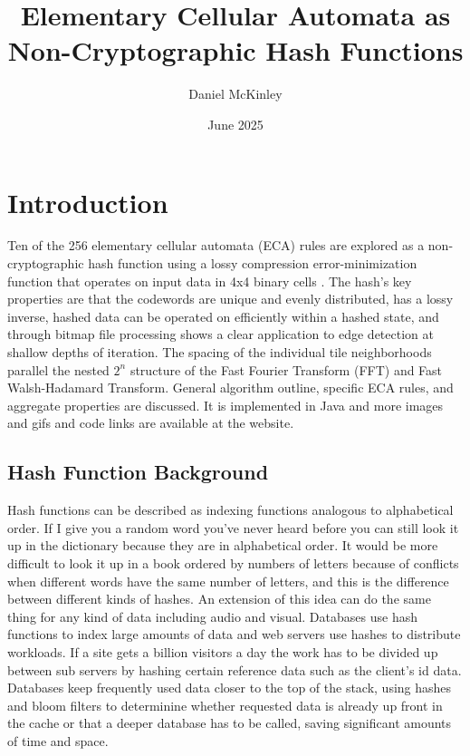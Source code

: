 \documentclass[11pt]{article}
\title{Elementary Cellular Automata as Non-Cryptographic Hash Functions}
\date{June 2025}
\author{Daniel McKinley}
\begin{document}
\maketitle

\section{Introduction}

Ten of the 256 elementary cellular automata (ECA) rules are explored as a non-cryptographic hash function using a lossy compression error-minimization function that operates on input data in 4x4 binary cells \cite{Wolfram}. The hash's key properties are that the codewords are unique and evenly distributed, has a lossy inverse, hashed data can be operated on efficiently within a hashed state, and through bitmap file processing shows a clear application to edge detection at shallow depths of iteration.  The spacing of the individual tile neighborhoods parallel the nested $2^n$ structure of the Fast Fourier Transform (FFT) and Fast Walsh-Hadamard Transform. General algorithm outline, specific ECA rules, and aggregate properties are discussed. It is implemented in Java and more images and gifs and code links are available at the website\cite{dmwebsite}.\\

\subsection{Hash Function Background}

Hash functions can be described as indexing functions analogous to alphabetical order. If I give you a random word you've never heard before you can still look it up in the dictionary because they are in alphabetical order. It would be more difficult to look it up in a book ordered by numbers of letters because of conflicts when different words have the same number of letters, and this is the difference between different kinds of hashes. An extension of this idea can do the same thing for any kind of data including audio and visual. Databases use hash functions to index large amounts of data and web servers use hashes to distribute workloads. If a site gets a billion visitors a day the work has to be divided up between sub servers by hashing certain reference data such as the client's id data. Databases keep frequently used data closer to the top of the stack, using hashes and bloom filters to determinine whether requested data is already up front in the cache or that a deeper database has to be called, saving significant amounts of time and space.\\
\end{document}
